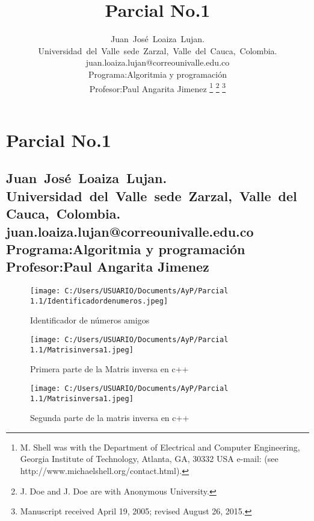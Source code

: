 \documentclass[journal]{IEEEtran}
\begin{document}
\title{Parcial No.1}


\author{Juan~José~Loaiza~Lujan.\\Universidad~del~Valle~sede~Zarzal,~Valle~del~Cauca,~Colombia.\\juan.loaiza.lujan@correounivalle.edu.co\\Programa:Algoritmia y programación\\Profesor:Paul Angarita Jimenez
\thanks{M. Shell was with the Department
of Electrical and Computer Engineering, Georgia Institute of Technology, Atlanta,
GA, 30332 USA e-mail: (see http://www.michaelshell.org/contact.html).}
\thanks{J. Doe and J. Doe are with Anonymous University.}
\thanks{Manuscript received April 19, 2005; revised August 26, 2015.}}





\section{Parcial No.1}
\subsection{Juan~José~Loaiza~Lujan.\\Universidad~del~Valle~sede~Zarzal,~Valle~del~Cauca,~Colombia.\\juan.loaiza.lujan@correounivalle.edu.co\\Programa:Algoritmia y programación\\Profesor:Paul Angarita Jimenez}

\begin{figure}[h!]
\centering
\texttt{[image: C:/Users/USUARIO/Documents/AyP/Parcial 1.1/Identificadordenumeros.jpeg]}
\caption{Identificador de números amigos}
\label{figure_sim}
\end{figure}


\begin{figure}[h!]
\centering
\texttt{[image: C:/Users/USUARIO/Documents/AyP/Parcial 1.1/Matrisinversa1.jpeg]}
\caption{Primera parte de la Matris inversa en c++}
\label{figure_sim}
\end{figure}

\begin{figure}[h!]
\centering
\texttt{[image: C:/Users/USUARIO/Documents/AyP/Parcial 1.1/Matrisinversa1.jpeg]}
\caption{Segunda parte de la matris inversa en c++}
\label{figure_sim}
\end{figure}
\end{document}

